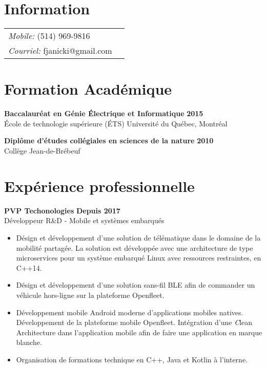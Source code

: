 \documentclass[margin,line]{res}
\begin{document}

\begin{resume}
  \section{\sc Information}
  \vspace{.05in}
  \begin{tabular}{@{}p{2in}p{4in}}
    {\it Mobile:}  (514) 969-9816      \\
    {\it Courriel:} fjanicki@gmail.com \\
  \end{tabular}


  \section{\sc Formation Académique}
   {\bf Baccalauréat en Génie Électrique et Informatique} \hfill {\bf 2015}\\
  École de technologie supérieure (ÉTS)
  Université du Québec, Montréal

  {\bf Diplôme d'études collégiales en sciences de la nature} \hfill {\bf 2010}\\
  Collège Jean-de-Brébeuf

  \section{\sc Expérience professionnelle}
   {\bf PVP Techonologies} \hfill {\bf Depuis 2017}\\
  Développeur R\&D - Mobile et systèmes embarqués\\
  \begin{itemize}
    \item Désign et développement d'une solution de télématique dans le domaine de la mobilité partagée. La solution est développée avec une architecture de type microservices pour un système embarqué Linux avec ressources restraintes, en C++14.
    \item Désign et développement d'une solution sans-fil BLE afin de commander un véhicule hors-ligne sur la plateforme Openfleet.
    \item Développement mobile Android moderne d'applications mobiles natives. Développement de la plateforme mobile Openfleet. Intégration d'une {\emph Clean Architecture} dans l'application mobile afin de faire une application en marque blanche.
    \item Organisation de formations technique en C++, Java et Kotlin à l'interne.
  \end{itemize}


\end{resume}
\end{document}
